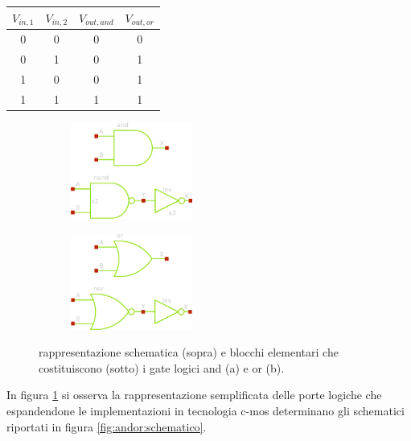 	\begin{center}
		\begin{tabular}{c c | c | c}
			$V_{in,1}$ & $V_{in,2}$ & $V_{out,and}$ & $V_{out,or}$ \\ \hline
			0 & 0 & 0 & 0 \\
			0 & 1 & 0 & 1 \\
			1 & 0 & 0 & 1 \\
			1 & 1 & 1 & 1 \\
		\end{tabular}
	\end{center}

	\begin{figure}[bht]
		\centering
		\begin{subfigure}{0.48\linewidth}
			\centering \includegraphics[width=4cm]{Immagini/and-simple} \caption{}
		\end{subfigure}
		\begin{subfigure}{0.48\linewidth}
			\centering \includegraphics[width=4cm]{Immagini/or-simple} \caption{}
		\end{subfigure}
		\caption{rappresentazione schematica (sopra) e blocchi elementari che costituiscono (sotto) i gate logici and (a) e or (b).}
		\label{fig:andor:simbolo}
	\end{figure}
	
	In figura \ref{fig:andor:simbolo} si osserva la rappresentazione semplificata delle porte logiche che espandendone le implementazioni in tecnologia c-mos determinano gli schematici riportati in figura \ref{fig:andor:schematico}.
	
